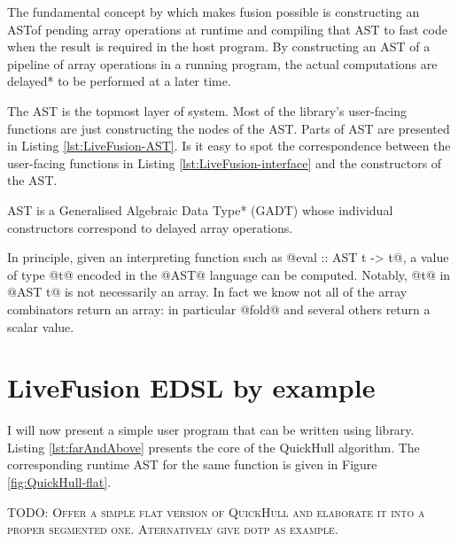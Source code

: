 \documentclass[preamble.tex]{subfiles}
\begin{document}
The fundamental concept by which \LiveFusion makes fusion possible is constructing an AST\iast of pending array operations at runtime and compiling that AST to fast code when the result is required in the host program. By constructing an AST of a pipeline of array operations in a running program, the actual computations are \*delayed* to be performed at a later time.

The AST is the topmost layer of \LiveFusion system. Most of the library's user-facing functions are just constructing the nodes of the AST. Parts of \LiveFusion AST are presented in Listing \ref{lst:LiveFusion-AST}. Is it easy to spot the correspondence between the user-facing functions in Listing \ref{lst:LiveFusion-interface} and the constructors of the AST.

\LiveFusion AST is a \*Generalised Algebraic Data Type* (GADT) \cite{Jones:2006eh} whose individual constructors correspond to delayed array operations.

In principle, given an interpreting function such as @eval :: AST t -> t@, a value of type @t@ encoded in the @AST@ language can be computed. Notably, @t@ in @AST t@ is not necessarily an array. In fact we know not all of the array combinators return an array: in particular @fold@ and several others return a scalar value.

\section{LiveFusion EDSL by example}

I will now present a simple user program that can be written using \LiveFusion library. Listing \ref{lst:farAndAbove} presents the core of the QuickHull algorithm. The corresponding runtime AST for the same function is given in Figure \ref{fig:QuickHull-flat}.

\textsc{TODO: Offer a simple flat version of QuickHull and elaborate it into a proper segmented one. Aternatively give dotp as example.}

\end{document}
